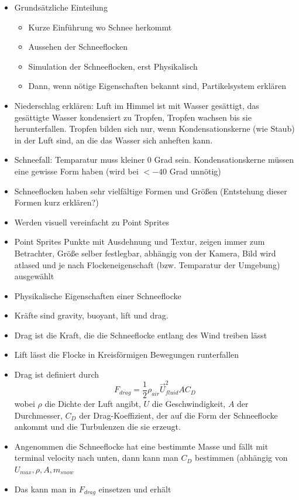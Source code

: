 \begin{itemize}
\item Grundsätzliche Einteilung
	\begin{itemize}
	\item Kurze Einführung wo Schnee herkommt
	\item Aussehen der Schneeflocken
	\item Simulation der Schneeflocken, erst Physikalisch
	\item Dann, wenn nötige Eigenschaften bekannt sind, Partikelsystem erklären
	\end{itemize}
\item Niederschlag erklären: Luft im Himmel ist mit Wasser gesättigt, das
gesättigte Wasser kondensiert zu Tropfen, Tropfen wachsen bis sie
herunterfallen. Tropfen bilden sich nur, wenn Kondensationskerne (wie Staub) in
der Luft sind, an die das Wasser sich anheften kann.
\item Schneefall: Temparatur muss kleiner 0 Grad sein. Kondensationskerne müssen
eine gewisse Form haben (wird bei $<-40$ Grad unnötig)
\item Schneeflocken haben sehr vielfältige Formen und Größen (Entstehung dieser Formen kurz erklären?)
\item Werden visuell vereinfacht zu Point Sprites
\item Point Sprites Punkte mit Ausdehnung und Textur, zeigen immer zum
Betrachter, Größe selber festlegbar, abhängig von der Kamera, Bild wird atlased
und je nach Flockeneigenschaft (bzw. Temparatur der Umgebung) ausgewählt
\item Physikalische Eigenschaften einer Schneeflocke
\item Kräfte sind gravity, buoyant, lift und drag.
\item Drag ist die Kraft, die die Schneeflocke entlang des Wind treiben lässt
\item Lift lässt die Flocke in Kreisförmigen Bewegungen runterfallen
\item Drag ist definiert durch
\[
F_{drag} = \frac{1}{2} \rho_{air} \vec{U}_{fluid}^2 A C_D
\]
wobei $\rho$ die Dichte der Luft angibt, $U$ die
Geschwindigkeit, $A$ der Durchmesser, $C_D$ der Drag-Koeffizient, der auf die
Form der Schneeflocke ankommt und die Turbulenzen die sie erzeugt.
\item Angenommen die Schneeflocke hat eine bestimmte Masse und fällt mit
terminal velocity nach unten, dann kann man $C_D$ bestimmen (abhängig von $U_{max}, \rho, A, m_{snow}$
\item Das kann man in $F_{drag}$ einsetzen und erhält

\end{itemize}
